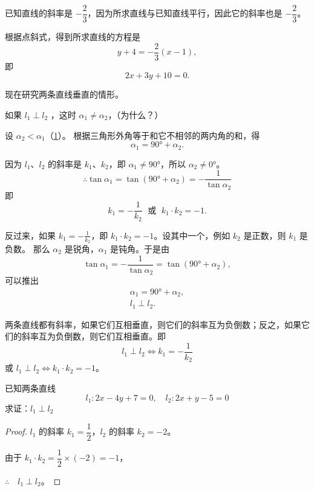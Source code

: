 \begin{solution}
已知直线的斜率是 $-\dfrac{2}{3}$，因为所求直线与已知直线平行，因此它的斜率也是 $-\dfrac{2}{3}$。

根据点斜式，得到所求直线的方程是
\[ y+4=-\frac{2}{3}(x-1),\]
即
\[ 2x+3y+10=0.\]
\end{solution}

现在研究两条直线垂直的情形。

如果 \(l_1 \perp l_2\) ，这时 $\alpha_1\neq\alpha_2$，（为什么？）

设 $\alpha_2<\alpha_1$（\cref{fig:1-30}）。
根据三角形外角等于和它不相邻的两内角的和，得
\[ \alpha_1=\ang{90}+\alpha_2. \]
\begin{figure}
  \begin{minipage}[b]{0.48\linewidth}\centering
    \subcaption{}\label{fig:1-30a}
  \end{minipage}
  \begin{minipage}[b]{0.48\linewidth}\centering
    \subcaption{}\label{fig:1-30b}
  \end{minipage}
  \caption{}\label{fig:1-30}
\end{figure}

因为 $l_1$、$l_2$ 的斜率是 $k_1$、$k_2$，即 $\alpha_1\neq\ang{90}$，所以 $\alpha_2\neq\ang{0}$。
\[ \therefore \tan\alpha_1 = \tan(\ang{90}+\alpha_2) = - \frac{1}{\tan\alpha_2} \]
即
\[
k_1=-\frac{1}{k_2}\;\text{ 或 }\;k_1 \cdot k_2 = -1.
\]

反过来，如果 $k_1=-\frac{1}{k_2}$，即 $k_1 \cdot k_2 = -1$。设其中一个，例如 $k_2$ 是正数，则 $k_1$ 是负数。
那么 $\alpha_2$ 是锐角，$\alpha_1$ 是钝角。于是由
\[ \tan\alpha_1 = - \frac{1}{\tan\alpha_2} = \tan(\ang{90}+\alpha_2), \]
可以推出
\begin{gather*}
  \alpha_1 = \ang{90} + \alpha_2,\\
l_1 \perp l_2.
\end{gather*}

两条直线都有斜率，如果它们互相垂直，则它们的斜率互为负倒数；反之，如果它们的斜率互为负倒数，则它们互相垂直。即
\[ l_1 \perp l_2 \Leftrightarrow k_1=-\frac{1}{k_2} \]
或 $ l_1 \perp l_2 \Leftrightarrow k_1 \cdot k_2 = -1$。

\begin{example}
已知两条直线
\[l_1:2x-4y+7=0, \quad l_2:2x+y-5=0\]
求证：$l_1\perp l_2$
\end{example}
\begin{proof}
$l_1$ 的斜率 $k_1=\dfrac{1}{2}$，$l_2$ 的斜率 $k_2=-2$。

由于 $k_1\cdot k_2 =\dfrac{1}{2}\times(-2)=-1$，

$\therefore \quad l_1\perp l_2$。
\end{proof}

